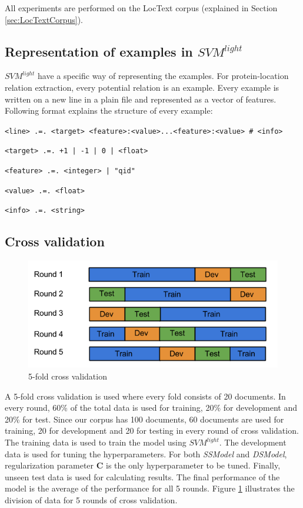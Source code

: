 All experiments are performed on the LocText \cite{loctext} corpus (explained in Section \ref{sec:LocTextCorpus}).

\subsection{Representation of examples in $SVM^{light}$ }

$SVM^{light}$ \cite{joachims1999making} have a specific way of representing the examples. For protein-location relation extraction, every potential relation is an example. Every example is written on a new line in a plain file and represented as a vector of features. Following format explains the structure of every example:

\bigskip

\texttt{<line> .=. <target> <feature>:<value>...<feature>:<value> \# <info>}

\texttt{<target> .=. +1 | -1 | 0 | <float>}

\texttt{<feature> .=. <integer> | "qid"}

\texttt{<value> .=. <float>}

\texttt{<info> .=. <string>}

\subsection{Cross validation}

\begin{figure}
\centering
\includegraphics[scale=0.6]{figures/CrossValidation.png}
\caption{5-fold cross validation}\label{fig:crossVal}
\end{figure}

A 5-fold cross validation is used where every fold consists of 20 documents. In every round, 60\% of the total data is used for training, 20\% for development and 20\% for test. Since our corpus has 100 documents, 60 documents are used for training, 20 for development and 20 for testing in every round of cross validation. The training data is used to train the model using $SVM^{light}$. The development data is used for tuning the hyperparameters. For both \textit{SSModel} and \textit{DSModel}, regularization parameter $\mathbf{C}$ is the only hyperparameter to be tuned.  Finally, unseen test data is used for calculating results. The final performance of the model is the average of the performance for all 5 rounds. Figure \ref{fig:crossVal} illustrates the division of data for 5 rounds of cross validation.

